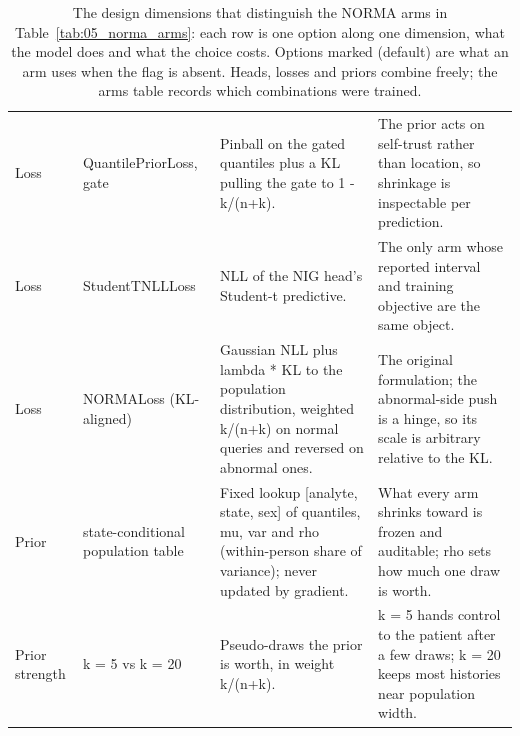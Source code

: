 \begin{table}[ht]
\begin{tabular}{l p{2.4cm} p{6.4cm} p{6.4cm}}
Loss & QuantilePriorLoss, gate & Pinball on the gated quantiles plus a KL pulling the gate to 1 - k/(n+k). & The prior acts on self-trust rather than location, so shrinkage is inspectable per prediction. \\
Loss & StudentTNLLLoss & NLL of the NIG head's Student-t predictive. & The only arm whose reported interval and training objective are the same object. \\
Loss & NORMALoss (KL-aligned) & Gaussian NLL plus lambda * KL to the population distribution, weighted k/(n+k) on normal queries and reversed on abnormal ones. & The original formulation; the abnormal-side push is a hinge, so its scale is arbitrary relative to the KL. \\
\midrule
Prior & state-conditional population table & Fixed lookup [analyte, state, sex] of quantiles, mu, var and rho (within-person share of variance); never updated by gradient. & What every arm shrinks toward is frozen and auditable; rho sets how much one draw is worth. \\
\midrule
Prior strength & k = 5 vs k = 20 & Pseudo-draws the prior is worth, in weight k/(n+k). & k = 5 hands control to the patient after a few draws; k = 20 keeps most histories near population width. \\
\bottomrule
\end{tabular}
\caption{The design dimensions that distinguish the NORMA arms in Table~\ref{tab:05_norma_arms}: each row is one option along one dimension, what the model does and what the choice costs. Options marked (default) are what an arm uses when the flag is absent. Heads, losses and priors combine freely; the arms table records which combinations were trained.}
\label{tab:05_design_choices}
\end{table}